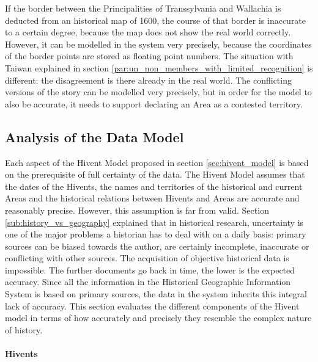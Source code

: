 If the border between the Principalities of Transsylvania and Wallachia is deducted from an historical map of 1600, the course of that border is inaccurate to a certain degree, because the map does not show the real world correctly. However, it can be modelled in the system very precisely, because the coordinates of the border points are stored as floating point numbers.
The situation with Taiwan explained in section \ref{par:un_non_members_with_limited_recognition} is different: the disagreement is there already in the real world. The conflicting versions of the story can be modelled very precisely, but in order for the model to also be accurate, it needs to support declaring an Area as a contested territory.

\subsection{Analysis of the Data Model} %
\label{sub:data_model}

Each aspect of the Hivent Model proposed in section \ref{sec:hivent_model} is based on the prerequisite of full certainty of the data. The Hivent Model assumes that the dates of the Hivents, the names and territories of the historical and current Areas and the historical relations between Hivents and Areas are accurate and reasonably precise. However, this assumption is far from valid. Section \ref{sub:history_vs_geography} explained that in historical research, uncertainty is one of the major problems a historian has to deal with on a daily basis: primary sources can be biased towards the author, are certainly incomplete, inaccurate or conflicting with other sources. The acquisition of objective historical data is impossible. The further documents go back in time, the lower is the expected accuracy. Since all the information in the Historical Geographic Information System is based on primary sources, the data in the system inherits this integral lack of accuracy. This section evaluates the different components of the Hivent model in terms of how accurately and precisely they resemble the complex nature of history.

\paragraph{Hivents} %
\label{par:evaluation_hivents}


